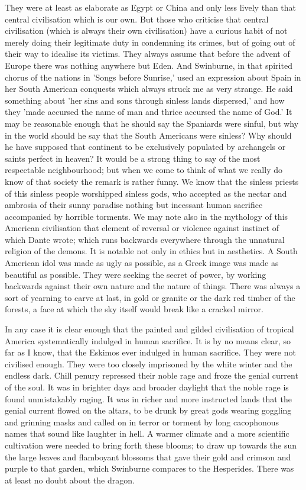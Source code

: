 They were at least as elaborate as Egypt or China and only less lively than that central civilisation which is our own. But those who criticise that central civilisation (which is always their own civilisation) have a curious habit of not merely doing their legitimate duty in condemning its crimes, but of going out of their way to idealise its victims. They always assume that before the advent of Europe there was nothing anywhere but Eden. And Swinburne, in that spirited chorus of the nations in 'Songs before Sunrise,' used an expression about Spain in her South American conquests which always struck me as very strange. He said something about 'her sins and sons through sinless lands dispersed,' and how they 'made accursed the name of man and thrice accursed the name of God.' It may be reasonable enough that he should say the Spaniards were sinful, but why in the world should he say that the South Americans were sinless? Why should he have supposed that continent to be exclusively populated by archangels or saints perfect in heaven? It would be a strong thing to say of the most respectable neighbourhood; but when we come to think of what we really do know of that society the remark is rather funny. We know that the sinless priests of this sinless people worshipped sinless gods, who accepted as the nectar and ambrosia of their sunny paradise nothing but incessant human sacrifice accompanied by horrible torments. We may note also in the mythology of this American civilisation that element of reversal or violence against instinct of which Dante wrote; which runs backwards everywhere through the unnatural religion of the demons. It is notable not only in ethics but in aesthetics. A South American idol was made as ugly as possible, as a Greek image was made as beautiful as possible. They were seeking the secret of power, by working backwards against their own nature and the nature of things. There was always a sort of yearning to carve at last, in gold or granite or the dark red timber of the forests, a face at which the sky itself would break like a cracked mirror.

In any case it is clear enough that the painted and gilded civilisation of tropical America systematically indulged in human sacrifice. It is by no means clear, so far as I know, that the Eskimos ever indulged in human sacrifice. They were not civilised enough. They were too closely imprisoned by the white winter and the endless dark. Chill penury repressed their noble rage and froze the genial current of the soul. It was in brighter days and broader daylight that the noble rage is found unmistakably raging. It was in richer and more instructed lands that the genial current flowed on the altars, to be drunk by great gods wearing goggling and grinning masks and called on in terror or torment by long cacophonous names that sound like laughter in hell. A warmer climate and a more scientific cultivation were needed to bring forth these blooms; to draw up towards the sun the large leaves and flamboyant blossoms that gave their gold and crimson and purple to that garden, which Swinburne compares to the Hesperides. There was at least no doubt about the dragon.

